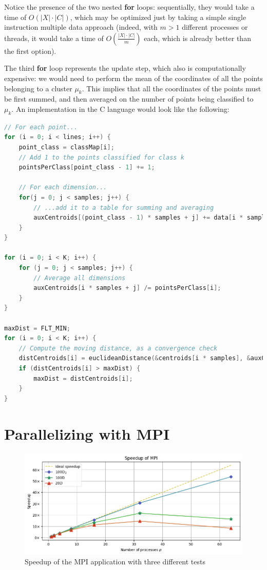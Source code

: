 \documentclass[11pt, journal]{IEEEtran}
\newcommand{\nwl}{

\vspace{11pt}

}
\begin{document}
Notice the presence of the two nested \textbf{for} loops: sequentially, they would take a time of $O(|X| \cdot |C|)$, which may be optimized just by taking a simple single instruction multiple data approach (indeed, with $m > 1$ different processes or threads, it would take a time of $O\left(\frac{|X| \cdot |C|}{m}\right)$ each, which is already better than the first option).
\nwl
The third \textbf{for} loop represents the update step, which also is computationally expensive: we would need to perform the mean of the coordinates of all the points belonging to a cluster $\mu_k$. This implies that all the coordinates of the points must be first summed, and then averaged on the number of points being classified to $\mu_k$. An implementation in the C language would look like the following:
\nwl
\begin{lstlisting}[language = C]
// For each point...
for (i = 0; i < lines; i++) {
    point_class = classMap[i];
    // Add 1 to the points classified for class k
    pointsPerClass[point_class - 1] += 1;

    // For each dimension...
    for(j = 0; j < samples; j++) {
        // ...add it to a table for summing and averaging
        auxCentroids[(point_class - 1) * samples + j] += data[i * samples + j];
    }
}

for (i = 0; i < K; i++) {
    for (j = 0; j < samples; j++) {
        // Average all dimensions
        auxCentroids[i * samples + j] /= pointsPerClass[i];
    }
}

maxDist = FLT_MIN;
for (i = 0; i < K; i++) {
    // Compute the moving distance, as a convergence check
    distCentroids[i] = euclideanDistance(&centroids[i * samples], &auxCentroids[i * samples], samples);
    if (distCentroids[i] > maxDist) {
        maxDist = distCentroids[i];
    }
}\end{lstlisting}


\section{Parallelizing with MPI}

\begin{figure}
    \label{mpi_speedup}
    \centering
    \includegraphics[width=\linewidth]{imgs/mpi_speedup.png}
    \caption{Speedup of the MPI application with three different tests}
\end{figure}
\end{document}
